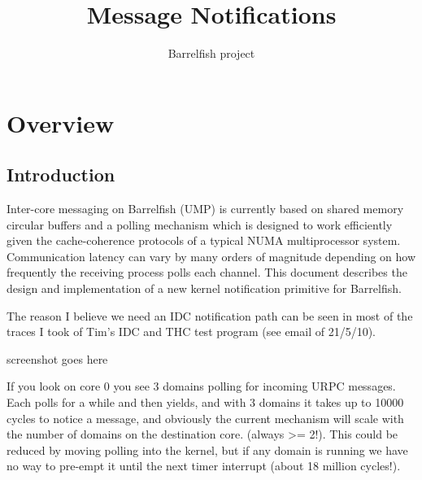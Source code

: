 \documentclass[a4paper,11pt,twoside]{report}
\title{Message Notifications}
\author{Barrelfish project}
\begin{document}
\maketitle			%

\begin{versionhistory}
\end{versionhistory}



\chapter{Overview}

\section{Introduction}
Inter-core messaging on Barrelfish (UMP) is currently based on shared
memory circular buffers and a polling mechanism which is designed to
work efficiently given the cache-coherence protocols of a typical NUMA
multiprocessor system. Communication latency can vary by many orders
of magnitude depending on how frequently the receiving process polls
each channel. This document describes the design and implementation of
a new kernel notification primitive for Barrelfish.

The reason I believe we need an IDC notification path can be seen in
most of the traces I took of Tim's IDC and THC test program (see
email of 21/5/10).  

screenshot goes here

If you look on core 0 you see 3 domains polling for incoming URPC
messages.  Each polls for a while and then yields, and with 3 domains
it takes up to 10000 cycles to notice a message, and obviously the
current mechanism will scale with the number of domains on the
destination core.  (always >= 2!).  This could be reduced by moving
polling into the kernel, but if any domain is running we have no way
to pre-empt it until the next timer interrupt (about 18 million
cycles!).
\end{document}
